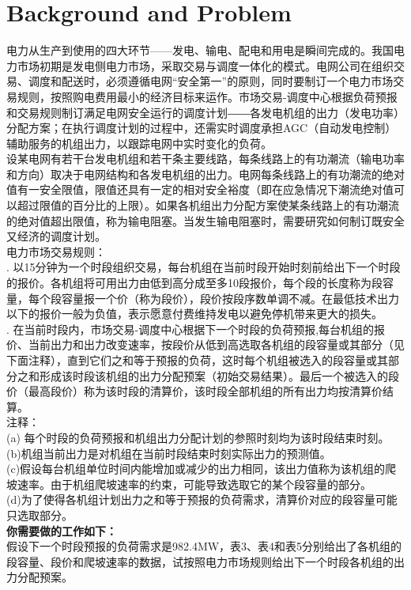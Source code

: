 \documentclass[12pt]{article} %
\begin{document}
	\section{Background and Problem}
	电力从生产到使用的四大环节——发电、输电、配电和用电是瞬间完成的。我国电力市场初期是发电侧电力市场，采取交易与调度一体化的模式。电网公司在组织交易、调度和配送时，必须遵循电网“安全第一”的原则，同时要制订一个电力市场交易规则，按照购电费用最小的经济目标来运作。市场交易-调度中心根据负荷预报和交易规则制订满足电网安全运行的调度计划――各发电机组的出力（发电功率）分配方案；在执行调度计划的过程中，还需实时调度承担AGC（自动发电控制）辅助服务的机组出力，以跟踪电网中实时变化的负荷。\\
	设某电网有若干台发电机组和若干条主要线路，每条线路上的有功潮流（输电功率和方向）取决于电网结构和各发电机组的出力。电网每条线路上的有功潮流的绝对值有一安全限值，限值还具有一定的相对安全裕度（即在应急情况下潮流绝对值可以超过限值的百分比的上限）。如果各机组出力分配方案使某条线路上的有功潮流的绝对值超出限值，称为输电阻塞。当发生输电阻塞时，需要研究如何制订既安全又经济的调度计划。\\
	\indent 电力市场交易规则：\\
	. 以15分钟为一个时段组织交易，每台机组在当前时段开始时刻前给出下一个时段的报价。各机组将可用出力由低到高分成至多10段报价，每个段的长度称为段容量，每个段容量报一个价（称为段价），段价按段序数单调不减。在最低技术出力以下的报价一般为负值，表示愿意付费维持发电以避免停机带来更大的损失。\\
	. 在当前时段内，市场交易-调度中心根据下一个时段的负荷预报,每台机组的报价、当前出力和出力改变速率，按段价从低到高选取各机组的段容量或其部分（见下面注释），直到它们之和等于预报的负荷，这时每个机组被选入的段容量或其部分之和形成该时段该机组的出力分配预案（初始交易结果）。最后一个被选入的段价（最高段价）称为该时段的清算价，该时段全部机组的所有出力均按清算价结算。\\
	\indent 注释：\\
	\indent (a)	每个时段的负荷预报和机组出力分配计划的参照时刻均为该时段结束时刻。\\
	\indent (b)机组当前出力是对机组在当前时段结束时刻实际出力的预测值。\\
	\indent (c)假设每台机组单位时间内能增加或减少的出力相同，该出力值称为该机组的爬坡速率。由于机组爬坡速率的约束，可能导致选取它的某个段容量的部分。\\
	\indent (d)为了使得各机组计划出力之和等于预报的负荷需求，清算价对应的段容量可能只选取部分。\\
	\indent \textbf{你需要做的工作如下：}\\
	\indent 假设下一个时段预报的负荷需求是982.4MW，表3、表4和表5分别给出了各机组的段容量、段价和爬坡速率的数据，试按照电力市场规则给出下一个时段各机组的出力分配预案。\\
\end{document}

